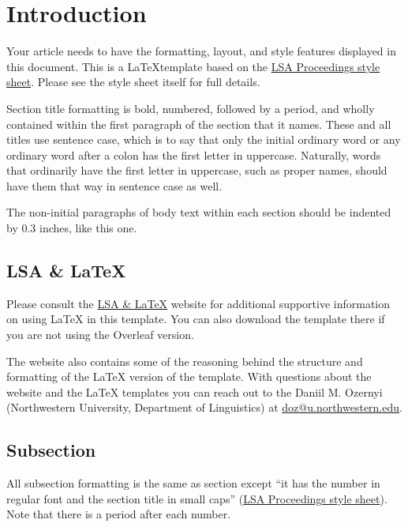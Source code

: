 \documentclass[12pt, letterpaper]{article}
\begin{document}
    \section{Introduction} %
    Your article needs to have the formatting, layout, and style features
    displayed in this document. This is a \LaTeX template based on the \href{https://journals.linguisticsociety.org/proceedings/index.php/PLSA/about/submissions.}{LSA
    Proceedings style sheet}. Please see the style sheet itself for full details.

    Section title formatting is bold, numbered, followed by a period, and wholly contained
    within the first paragraph of the section that it names. These and all
    titles use sentence case, which is to say that only the initial ordinary word
    or any ordinary word after a colon has the first letter in uppercase.
    Naturally, words that ordinarily have the first letter in uppercase, such as
    proper names, should have them that way in sentence case as well.

    The non-initial paragraphs of body text within each section should be indented
    by 0.3 inches, like this one.

    \subsection{LSA \& \LaTeX{}}
    Please consult the
    \href{https://dozernyi.gitlab.io/lsalatex/}{LSA \& \LaTeX{}} website for
    additional supportive information on using \LaTeX{} in this template. You
    can also download the template there if you are not using the Overleaf
    version.

    The website also contains some of the reasoning behind the structure and
    formatting of the \LaTeX{} version of the template. With questions about the
    website and the \LaTeX{} templates you can reach out to the Daniil M.
    Ozernyi (Northwestern University, Department of Linguistics) at \href{mailto:doz@u.northwestrn.edu}{doz@u.northwestern.edu}.

    \subsection{Subsection}
    All subsection formatting is the same as section except ``it has the number in
    regular font and the section title in small caps'' (\href{https://journals.linguisticsociety.org/proceedings/index.php/PLSA/about/submissions}{LSA
    Proceedings style sheet}). Note that there is a period after each number.
\end{document}
